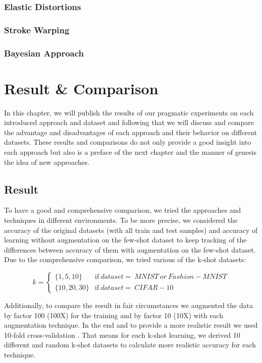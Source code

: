 \subsection{Elastic Distortions}
\subsection{Stroke Warping}
\subsection{Bayesian Approach}


\chapter{Result \& Comparison}
\label{tit:results}
In this chapter, we will publish the results of our pragmatic experiments on each introduced
approach and dataset and following that we will discuss and compare the advantage and disadvantages
of each approach and their behavior on different datasets. These results and comparisons do not only
provide a good insight into each approach but also is a preface of the next chapter and the manner
of genesis the idea of new approaches.

\section{Result}
To have a good and comprehensive comparison, we tried the approaches and techniques in different
environments. To be more precise, we considered the accuracy of the original datasets (with all
train and test samples) and accuracy of learning without augmentation on the few-shot dataset to
keep tracking of the differences between accuracy of them with augmentation on the few-shot dataset.
Due to the comprehensive comparison, we tried various of the k-shot datasets:

\begin{equation}
  k=
  \begin{cases}
    \{1, 5, 10\}   & \text{if}\ dataset=
    \ MNIST \ or \ Fashion-MNIST                    \\
    \{10, 20, 30\} & \text{if}\ dataset= \ CIFAR-10
  \end{cases}
\end{equation}

Additionally, to compare the result in fair circumstances we augmented the data by factor 100 (100X)
for the training and by factor 10 (10X) with each augmentation technique. In the end and to provide
a more realistic result we used 10-fold cross-validation \cite{cross_validation}. That means for each k-shot learning, we
derived 10 different and random k-shot datasets to calculate more realistic accuracy for each
technique.

